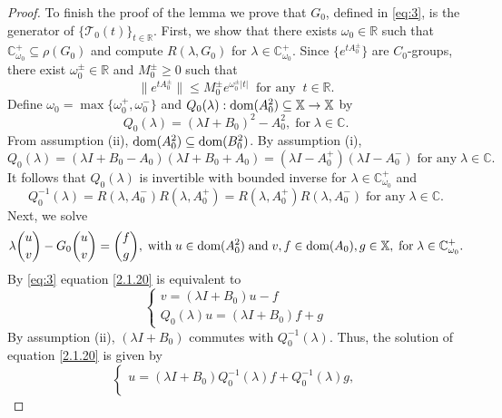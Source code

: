 \documentclass[11pt]{amsart}
\numberwithin{equation}{section}
\newcommand\R{\mathbb R}
\newcommand{\RR}{{\mathbb R}}
\newcommand{\CC}{{\mathbb C}}
\theoremstyle{remark}
\theoremstyle{definition}
\newcommand\cT{{\mathcal T}}
\newcommand\bX{{\mathbb X}}
\newcommand{\dom}{\text{\rm{dom}}}
\begin{document}
\begin{proof}
	To finish the proof of the lemma we prove that $G_0$, defined in \eqref{eq:3}, is the generator of $\{\cT_0(t)\}_{t\in\R}$. First, we show that there exists $\omega_0\in\RR$ such that $\CC_{\omega_0}^+\subseteq\rho(G_0)$ and compute $R(\lambda,G_0)$ for $\lambda\in\CC_{\omega_0}^+$. Since $\{e^{tA_0^\pm}\}$ are $C_0$-groups, there exist $\omega_0^\pm\in\R$ and $M_0^\pm\geq 0$ such that
	\begin{equation}\label{2.1.16}
		\|e^{tA_0^\pm}\|\le M_0^\pm e^{\omega_0^\pm|t|}\;\;\mbox{for any}\;\;t\in\R.
	\end{equation}
	Define $\omega_0=\max\{\omega_0^+,\omega_0^-\}$ and $Q_0(\lambda):\dom(A_0^2)\subseteq\bX\to \bX$ by
	\begin{equation}\label{2.1.17}
		Q_0(\lambda)=(\lambda I+B_0)^2-A_0^2,\;\mbox{for}\;\lambda\in\CC.
	\end{equation}
	From assumption (ii),  $\dom(A_0^2)\subseteq\dom(B_0^2)$. By assumption (i), 
	\begin{equation}\label{2.1.18}
		Q_0(\lambda)=(\lambda I+B_0-A_0)(\lambda I+B_0+A_0)=(\lambda I-A_0^+)(\lambda I-A_0^-)\;\mbox{for any}\;\lambda\in\CC.
	\end{equation}
	It follows that $Q_0(\lambda)$ is invertible with bounded inverse for $\lambda\in\mathbb{C}_{\omega_0}^+$ and 
	\begin{equation}\label{2.1.19}
		Q_0^{-1}(\lambda)=R(\lambda,A_0^-)R(\lambda,A_0^+)=R(\lambda,A_0^+)R(\lambda,A_0^-)\;\mbox{for any}\;\lambda\in\CC.
	\end{equation}
	Next, we solve 
	\begin{equation}\label{2.1.20}
		\lambda\binom{u}{v}-G_0\binom{u}{v}=\binom{f}{g},\;\mbox{with}\; u\in\dom(A_0^2)\;\mbox{and}\; v,f\in\dom(A_0), g\in\bX,\;\mbox{for}\; \lambda\in\mathbb{C}_{\omega_0}^+. 
	\end{equation}
	By \eqref{eq:3} equation \eqref{2.1.20} is equivalent to
	\begin{equation}\label{2.1.21}
		\begin{cases}v=(\lambda I+B_0)u-f\\Q_0(\lambda)u=(\lambda I+B_0)f+g\end{cases}
	\end{equation}
	By assumption (ii), $(\lambda I+B_0)$ commutes with $Q_0^{-1}(\lambda)$. Thus, the solution of equation \eqref{2.1.20} is given by
	\begin{equation}\label{2.1.22}
		\begin{cases}
			u=(\lambda I+B_0)Q_0^{-1}(\lambda)f+Q_0^{-1}(\lambda)g,\\

\end{cases}
\end{equation}
\end{proof}
\end{document}
